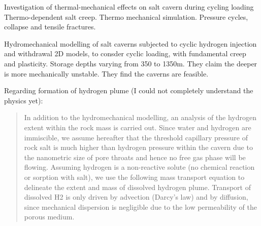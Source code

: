 \begin{frame}{\cite{li2021investigation} Investigation of thermal-mechanical effects on salt cavern during cycling loading}
Thermo-dependent salt creep. Thermo mechanical simulation. Pressure cycles, collapse and tensile fractures.
\end{frame}

\begin{frame}[shrink=30,fragile]{\cite{coarita23} Hydromechanical modelling of salt caverns subjected to cyclic hydrogen injection and withdrawal}
2D models, to consder cyclic loading, with fundamental creep and plasticity. Storage depths varying from 350 to 1350m. They claim the deeper is more mechanically unstable. They find the caverns are feasible.

Regarding formation of hydrogen plume (I could not completely understand the physics yet):
\begin{quote}
In addition to the hydromechanical modelling, an analysis of the
hydrogen extent within the rock mass is carried out. Since water and
hydrogen are immiscible, we assume hereafter that the threshold
capillary pressure of rock salt is much higher than hydrogen pressure
within the cavern due to the nanometric size of pore throats and hence
no free gas phase will be flowing. Assuming hydrogen is a non-reactive
solute (no chemical reaction or sorption with salt), we use the following
mass transport equation to delineate the extent and mass of dissolved
hydrogen plume. Transport of dissolved H2 is only driven by advection
(Darcy’s law) and by diffusion, since mechanical dispersion is negligible
due to the low permeability of the porous medium.
\end{quote}
\end{frame}
%
%
%
